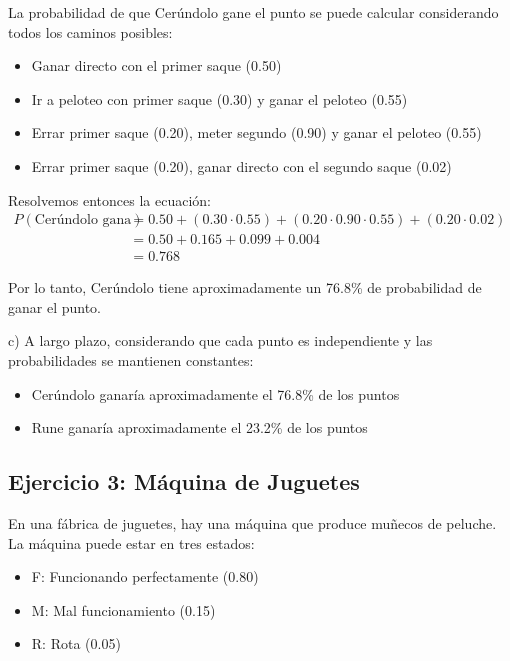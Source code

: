 \documentclass[a4paper,11pt]{article}
\begin{document}
La probabilidad de que Cerúndolo gane el punto se puede calcular considerando todos los caminos posibles:
\begin{itemize}
    \item Ganar directo con el primer saque (0.50)
    \item Ir a peloteo con primer saque (0.30) y ganar el peloteo (0.55)
    \item Errar primer saque (0.20), meter segundo (0.90) y ganar el peloteo (0.55)
    \item Errar primer saque (0.20), ganar directo con el segundo saque (0.02)
\end{itemize}

Resolvemos entonces la ecuación:
\[
\begin{split}
P(\text{Cerúndolo gana}) &= 0.50 + (0.30 \cdot 0.55) + (0.20 \cdot 0.90 \cdot 0.55) + (0.20 \cdot 0.02) \\
&= 0.50 + 0.165 + 0.099 + 0.004 \\
&= 0.768
\end{split}
\]

Por lo tanto, Cerúndolo tiene aproximadamente un 76.8\% de probabilidad de ganar el punto.

\vspace{0.5em}

c) A largo plazo, considerando que cada punto es independiente y las probabilidades se mantienen constantes:
\begin{itemize}
    \item Cerúndolo ganaría aproximadamente el 76.8\% de los puntos
    \item Rune ganaría aproximadamente el 23.2\% de los puntos
\end{itemize}

\subsection{Ejercicio 3: Máquina de Juguetes}

En una fábrica de juguetes, hay una máquina que produce muñecos de peluche. La máquina puede estar en tres estados:

\begin{itemize}
    \item F: Funcionando perfectamente (0.80)
    \item M: Mal funcionamiento (0.15)
    \item R: Rota (0.05)
\end{itemize}
\end{document}
